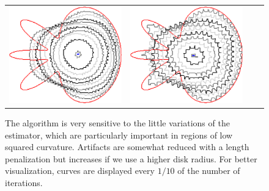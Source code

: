 \begin{figure}
\begin{tabular}{p{2.5em}ccc}
\includegraphics[scale=0.23]{figures/chapter6/radius-effect/flower/improve/len_pen0.5/radius-5/summary.pdf} &
\includegraphics[scale=0.23]{figures/chapter6/radius-effect/flower/improve/len_pen0.5/radius-9/summary.pdf}
\end{tabular}

\caption{ The algorithm is very sensitive to the little variations of the estimator, which are particularly important in regions of low squared curvature. Artifacts are somewhat reduced with a length penalization but increases if we use a higher disk radius. For better visualization, curves are displayed every $1/10$ of the number of iterations. }
\label{ch6:fig:m1-square-flow}
\end{figure}


